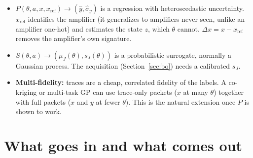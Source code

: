 \documentclass[10pt]{article}
\begin{document}
\begin{advanced}
\begin{itemize}
\item $P(\theta, a, x, x_\text{ref}) \rightarrow (\hat y, \hat\sigma_y)$ is a regression with heteroscedastic uncertainty.
  $x_\text{ref}$ identifies the amplifier (it generalizes to amplifiers never seen, unlike an amplifier one-hot) and estimates the
  state $z$, which $\theta$ cannot. $\Delta x = x - x_\text{ref}$ removes the amplifier's own signature.
\item $S(\theta, a) \rightarrow (\mu_J(\theta), s_J(\theta))$ is a probabilistic surrogate, normally a Gaussian process. The
  acquisition (Section~\ref{sec:bo}) needs a calibrated $s_J$.
\item \textbf{Multi-fidelity:} traces are a cheap, correlated fidelity of the labels. A co-kriging or multi-task GP can use
  trace-only packets ($x$ at many $\theta$) together with full packets ($x$ and $y$ at fewer $\theta$). This is the natural extension
  once $P$ is shown to work.
\end{itemize}
\end{advanced}

\section{What goes in and what comes out}
\end{document}
